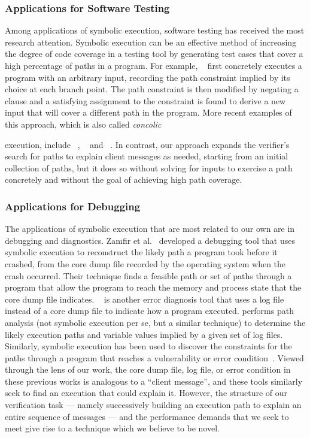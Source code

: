 \subsubsection{Applications for Software Testing}
Among applications of symbolic execution, software testing has
received the most research attention. Symbolic execution can be an
effective method of increasing the degree of code coverage in a
testing tool by generating test cases that cover a high percentage of
paths in a program.  For example, \dart~\cite{godefroid05:dart} first
concretely executes a program with an arbitrary input, recording the
path constraint implied by its choice at each branch point.  The path
constraint is then modified by negating a clause and a satisfying
assignment to the constraint is found to derive a new input that will
cover a different path in the program. More recent examples of this
approach, which is also called {\em concolic} execution, include
\cute~\cite{sen05:cute}, \jpf~\cite{visser04:tig} and
\pex~\cite{tillmann08:pex,anand08:demand}.  In contrast, our approach expands the
verifier's search for paths to explain client messages as needed,
starting from an initial collection of paths, but it does so without
solving for inputs to exercise a path concretely and without the goal
of achieving high path coverage.

\subsubsection{Applications for Debugging}
The applications of symbolic execution that are most related to our
own are in debugging and diagnostics. Zamfir et
al.~\cite{zamfir10:exesyn} developed a debugging tool that uses
symbolic execution to reconstruct the likely path a program took
before it crashed, from the core dump file recorded by the operating
system when the crash occurred.  Their technique finds a feasible path
or set of paths through a program that allow the program to reach the
memory and process state that the core dump file indicates.
\sherlog~\cite{yuan10:sherlog} is another error diagnosis tool that
uses a log file instead of a core dump file to indicate how a program
executed.  \sherlog performs path analysis (not symbolic execution per
se, but a similar technique) to determine the likely execution paths
and variable values implied by a given set of log files.  Similarly,
symbolic execution has been used to discover the constraints for the
paths through a program that reaches a vulnerability or error
condition~\cite{brumley06:vulnsig,caballero09:vulnsig,cadar06:exe,yang06:maldisks}.
Viewed through the lens of our work, the core dump file, log file,
or error condition in these previous works is analogous to a ``client
message'', and these tools similarly seek to find an execution that
could explain it.  However, the structure of our verification task ---
namely successively building an execution path to explain an entire
sequence of messages --- and the performance demands that we seek to
meet give rise to a technique which we believe to be novel.


